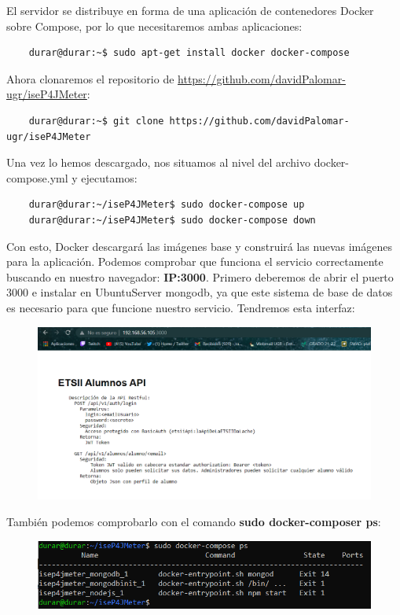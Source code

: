 \documentclass[a4paper]{article}
\begin{document}
El servidor se distribuye en forma de  una aplicación de contenedores Docker sobre
Compose, por lo que necesitaremos ambas aplicaciones:
\begin{lstlisting}
    durar@durar:~$ sudo apt-get install docker docker-compose
\end{lstlisting}
Ahora clonaremos el repositorio de \href{https://github.com/davidPalomar-ugr/iseP4JMeter}{https://github.com/davidPalomar-ugr/iseP4JMeter}:
\begin{lstlisting}
    durar@durar:~$ git clone https://github.com/davidPalomar-ugr/iseP4JMeter
\end{lstlisting}
Una vez lo hemos descargado, nos situamos al nivel del archivo docker-compose.yml y ejecutamos:
\begin{lstlisting}
    durar@durar:~/iseP4JMeter$ sudo docker-compose up
    durar@durar:~/iseP4JMeter$ sudo docker-compose down
\end{lstlisting}
Con esto, Docker descargará las imágenes base y construirá las nuevas imágenes para
la aplicación. 
Podemos comprobar que funciona el servicio correctamente buscando en nuestro navegador:
\textbf{IP:3000}. Primero deberemos de abrir el puerto 3000 e instalar en UbuntuServer
mongodb, ya que este sistema de base de datos es necesario para que funcione nuestro servicio. 
Tendremos esta interfaz: \newline
\begin{figure}[hbt!]
    \centering
    \includegraphics[width=\textwidth]{direccion docker.png}
\end{figure}
\newline También podemos comprobarlo con el comando \textbf{sudo docker-composer ps}:
\begin{figure}[hbt!]
    \centering
    \includegraphics[width=\textwidth]{salida docker-compose ps.png}
\end{figure}
\end{document}
